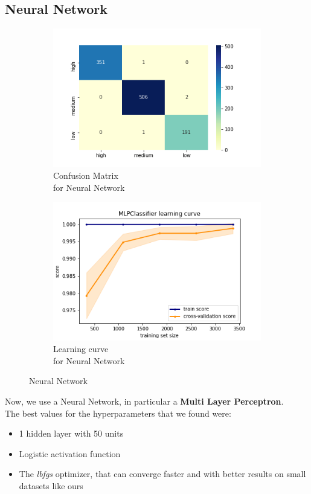 \subsection{Neural Network}
\begin{figure}[h!]
     \captionsetup{justification=centering}             
     \centering
     \begin{subfigure}{0.49\textwidth}
         \centering
         \captionsetup{type=figure}
         \includegraphics[scale=0.45]{img/classification/nn_confusion.png}
         \caption{Confusion Matrix \\ for Neural Network}
         \label{fig:nn_confusion}
     \end{subfigure}
     \begin{subfigure}{0.49\textwidth}
         \centering
         \includegraphics[scale=0.45]{img/classification/nn_lc.png}
         \caption{Learning curve \\ for Neural Network}
         \label{fig:nn_lc}
     \end{subfigure}
     \caption{Neural Network}
    \label{fig:nn}
\end{figure}
Now, we use a Neural Network, in particular a \textbf{Multi Layer Perceptron}.\\
The best values for the hyperparameters that we found were:
\begin{itemize}
\item 1 hidden layer with 50 units
\item Logistic activation function
\item The \emph{lbfgs} optimizer, that can converge faster and with better results on small datasets like ours
\end{itemize}

